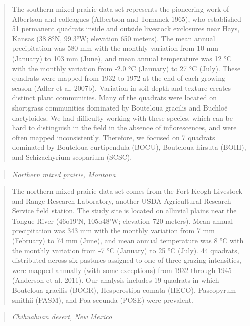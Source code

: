 \documentclass[12pt,]{article}
\begin{document}
\begin{quote}
The southern mixed prairie data set represents the pioneering work of
Albertson and colleagues (Albertson and Tomanek 1965), who established
51 permanent quadrats inside and outside livestock exclosures near Hays,
Kansas (38.8°N, 99.3°W; elevation 650 meters). The mean annual
precipitation was 580 mm with the monthly variation from 10 mm (January)
to 103 mm (June), and mean annual temperature was 12 °C with the monthly
variation from -2.0 °C (January) to 27 °C (July). These quadrats were
mapped from 1932 to 1972 at the end of each growing season (Adler et al.
2007b). Variation in soil depth and texture creates distinct plant
communities. Many of the quadrats were located on shortgrass communities
dominated by Bouteloua gracilis and Buchloë dactyloides. We had
difficulty working with these species, which can be hard to distinguish
in the field in the absence of inflorescences, and were often mapped
inconsistently. Therefore, we focused on 7 quadrats dominated by
Bouteloua curtipendula (BOCU), Bouteloua hirsuta (BOHI), and
Schizachyrium scoparium (SCSC).
\end{quote}

\begin{quote}
\emph{Northern mixed prairie, Montana}
\end{quote}

\begin{quote}
The northern mixed prairie data set comes from the Fort Keogh Livestock
and Range Research Laboratory, another USDA Agricultural Research
Service field station. The study site is located on alluvial plains near
the Tongue River (46o19'N, 105o48'W; elevation 720 meters). Mean annual
precipitation was 343 mm with the monthly variation from 7 mm (February)
to 74 mm (June), and mean annual temperature was 8 °C with the monthly
variation from -7 °C (January) to 25 °C (July). 44 quadrats, distributed
across six pastures assigned to one of three grazing intensities, were
mapped annually (with some exceptions) from 1932 through 1945 (Anderson
et al. 2011). Our analysis includes 19 quadrats in which Bouteloua
gracilis (BOGR), Hesperostipa comata (HECO), Pascopyrum smithii (PASM),
and Poa secunda (POSE) were prevalent.
\end{quote}

\begin{quote}
\emph{Chihuahuan desert, New Mexico}
\end{quote}
\end{document}
